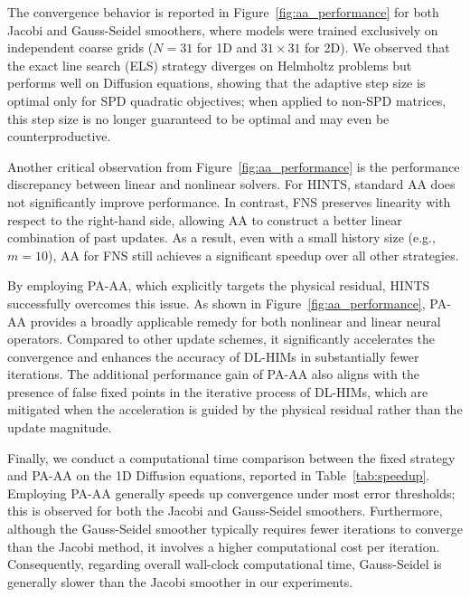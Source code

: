 \documentclass[11pt]{article}
\begin{document}
The convergence behavior is reported in Figure~\ref{fig:aa_performance} for both Jacobi and Gauss-Seidel smoothers, where models were trained exclusively on independent coarse grids ($N=31$ for 1D and $31\times 31$ for 2D). We observed that the exact line search (ELS) strategy diverges on Helmholtz problems but performs well on Diffusion equations, showing that the adaptive step size is optimal only for SPD quadratic objectives; when applied to non-SPD matrices, this step size is no longer guaranteed to be optimal and may even be counterproductive.

Another critical observation from Figure~\ref{fig:aa_performance} is the performance discrepancy between linear and nonlinear solvers. For HINTS, standard AA does not significantly improve performance. In contrast, FNS preserves linearity with respect to the right-hand side, allowing AA to construct a better linear combination of past updates. As a result, even with a small history size (e.g., $m=10$), AA for FNS still achieves a significant speedup over all other strategies.

By employing PA-AA, which explicitly targets the physical residual, HINTS successfully overcomes this issue. As shown in Figure~\ref{fig:aa_performance}, PA-AA provides a broadly applicable remedy for both nonlinear and linear neural operators. Compared to other update schemes, it significantly accelerates the convergence and enhances the accuracy of DL-HIMs in substantially fewer iterations. The additional performance gain of PA-AA also aligns with the presence of false fixed points in the iterative process of DL-HIMs, which are mitigated when the acceleration is guided by the physical residual rather than the update magnitude.

Finally, we conduct a computational time comparison between the fixed strategy and PA-AA on the 1D Diffusion equations, reported in Table~\ref{tab:speedup}. Employing PA-AA generally speeds up convergence under most error thresholds; this is observed for both the Jacobi and Gauss-Seidel smoothers. Furthermore, although the Gauss-Seidel smoother typically requires fewer iterations to converge than the Jacobi method, it involves a higher computational cost per iteration. Consequently, regarding overall wall-clock computational time, Gauss-Seidel is generally slower than the Jacobi smoother in our experiments.
\end{document}
